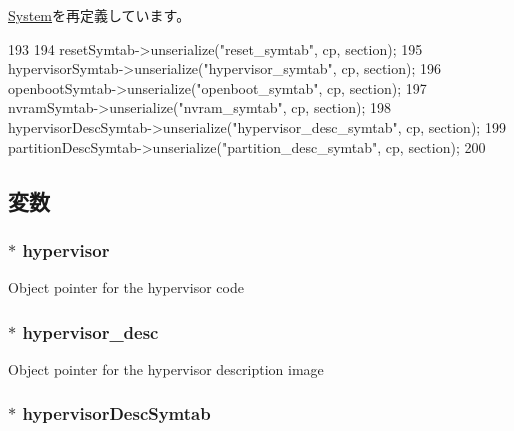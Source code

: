 \hyperlink{classSystem_a3536a2e47acf307ec65515712f0e2b2d}{System}を再定義しています。


\begin{DoxyCode}
193 {
194     resetSymtab->unserialize("reset_symtab", cp, section);
195     hypervisorSymtab->unserialize("hypervisor_symtab", cp, section);
196     openbootSymtab->unserialize("openboot_symtab", cp, section);
197     nvramSymtab->unserialize("nvram_symtab", cp, section);
198     hypervisorDescSymtab->unserialize("hypervisor_desc_symtab", cp, section);
199     partitionDescSymtab->unserialize("partition_desc_symtab", cp, section);
200 }
\end{DoxyCode}


\subsection{変数}
\hypertarget{classSparcSystem_a693eeebf890fe16aa181edba9fc1c542}{
\subsubsection[{hypervisor}]{$\ast$ {\bf hypervisor}}}
\label{classSparcSystem_a693eeebf890fe16aa181edba9fc1c542}
Object pointer for the hypervisor code \hypertarget{classSparcSystem_aa995bbd1ec284b0db88f63ca31ba5ca4}{
\subsubsection[{hypervisor\_\-desc}]{$\ast$ {\bf hypervisor\_\-desc}}}
\label{classSparcSystem_aa995bbd1ec284b0db88f63ca31ba5ca4}
Object pointer for the hypervisor description image \hypertarget{classSparcSystem_abae16aef710e4b7f10e3f922505189e7}{
\subsubsection[{hypervisorDescSymtab}]{$\ast$ {\bf hypervisorDescSymtab}}}
\label{classSparcSystem_abae16aef710e4b7f10e3f922505189e7}

